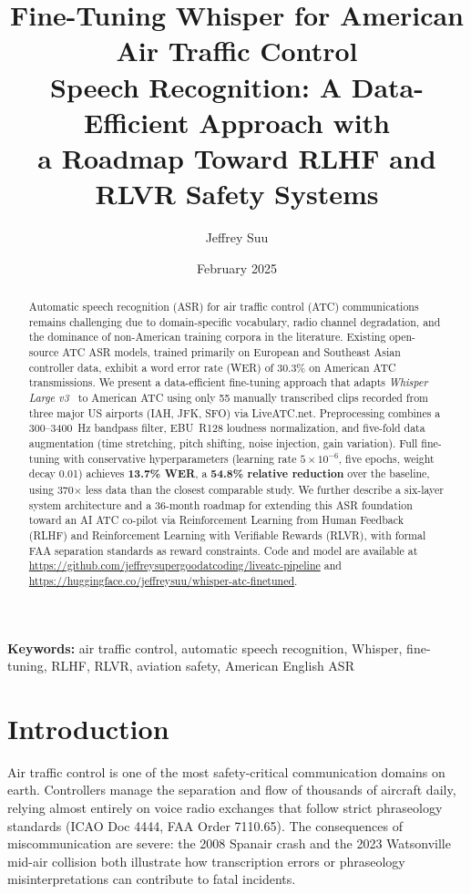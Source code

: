 \documentclass[11pt,a4paper]{article}
\title{\textbf{Fine-Tuning Whisper for American Air Traffic Control\\
Speech Recognition: A Data-Efficient Approach with\\
a Roadmap Toward RLHF and RLVR Safety Systems}}
\author{Jeffrey Suu}
\affil{Independent Researcher}
\date{February 2025}
\begin{document}
\maketitle

\begin{abstract}
Automatic speech recognition (ASR) for air traffic control (ATC) communications
remains challenging due to domain-specific vocabulary, radio channel degradation,
and the dominance of non-American training corpora in the literature.
Existing open-source ATC ASR models, trained primarily on European and Southeast
Asian controller data, exhibit a word error rate (WER) of 30.3\% on American
ATC transmissions.
We present a data-efficient fine-tuning approach that adapts
\textit{Whisper Large v3}~\cite{radford2023whisper} to American ATC using
only 55 manually transcribed clips recorded from three major US airports
(IAH, JFK, SFO) via LiveATC.net.
Preprocessing combines a 300--3400~Hz bandpass filter, EBU~R128 loudness
normalization, and five-fold data augmentation (time stretching, pitch shifting,
noise injection, gain variation).
Full fine-tuning with conservative hyperparameters (learning rate $5 \times 10^{-6}$,
five epochs, weight decay 0.01) achieves \textbf{13.7\% WER}, a
\textbf{54.8\% relative reduction} over the baseline, using 370$\times$ less data
than the closest comparable study.
We further describe a six-layer system architecture and a 36-month roadmap for
extending this ASR foundation toward an AI ATC co-pilot via
Reinforcement Learning from Human Feedback (RLHF) and Reinforcement Learning
with Verifiable Rewards (RLVR), with formal FAA separation standards as
reward constraints.
Code and model are available at \url{https://github.com/jeffreysupergoodatcoding/liveatc-pipeline}
and \url{https://huggingface.co/jeffreysuu/whisper-atc-finetuned}.
\end{abstract}

\vspace{1em}
\noindent\textbf{Keywords:} air traffic control, automatic speech recognition,
Whisper, fine-tuning, RLHF, RLVR, aviation safety, American English ASR

\section{Introduction}

Air traffic control is one of the most safety-critical communication domains on
earth. Controllers manage the separation and flow of thousands of aircraft
daily, relying almost entirely on voice radio exchanges that follow strict
phraseology standards (ICAO Doc 4444, FAA Order 7110.65).
The consequences of miscommunication are severe: the 2008 Spanair crash and
the 2023 Watsonville mid-air collision both illustrate how transcription errors
or phraseology misinterpretations can contribute to fatal incidents.
\end{document}
